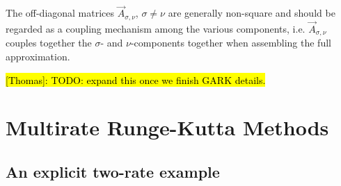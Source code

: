 \documentclass{article}
\begin{document}
The off-diagonal matrices $\vec{A}_{\sigma, \nu}$, $\sigma \neq \nu$ are generally non-square
and should be regarded as a coupling mechanism among the various components, i.e.
$\vec{A}_{\sigma, \nu}$ couples together the $\sigma$- and $\nu$-components together when assembling
the full approximation.

\hl{[Thomas]: TODO: expand this once we finish GARK details.}

\section{Multirate Runge-Kutta Methods}

\subsection{An explicit two-rate example}
\end{document}
